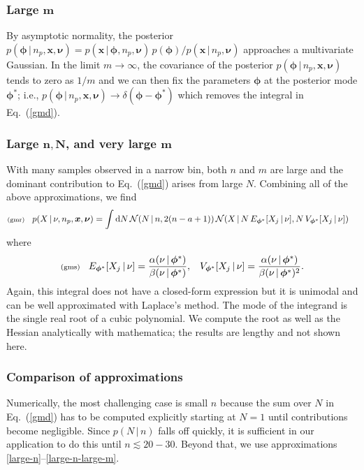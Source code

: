 \documentclass[11pt]{article}
\newcommand{\lleq}[1]{\label{#1} }
\renewcommand{\lleq}[1]{\label{#1} {\scriptstyle {\rm (#1)}} \hspace*{2ex} }
\newcommand{\cond}{\,|\,}
\newcommand{\bmm}{{\bm{m}}}
\newcommand{\bmn}{{\bm{n}}}
\newcommand{\bmx}{{{\bm{x}}}}
\newcommand{\bmN}{{\bm{N}}}
\newcommand{\bmphi}{{\bm{\phi}}}
\newcommand{\bmnu}{{\bm{\nu}}}
\newcommand{\refeq}[1]{Eq.~(\ref{#1})}
\newcommand{\npack}{n_p}
\newcommand{\rmdx}[1]{\mbox{d} #1 \,} %
\begin{document}
\subsubsection*{Large $\bmm$}\label{large-m}

By asymptotic normality, the posterior $p(\bmphi \cond \npack, \bmx,
\bmnu) = p(\bmx\cond \bmphi, \npack, \bmnu) \, p(\bmphi) / p(\bmx
\cond \npack, \bmnu)$ approaches a multivariate Gaussian. In the limit
$m \to \infty$, the covariance of the posterior $p(\bmphi \cond
\npack, \bmx, \bmnu)$ tends to zero as $1/m$ and we can then fix the
parameters $\bmphi$ at the posterior mode $\bmphi^*$; i.e., $p(\bmphi
\cond \npack, \bmx, \bmnu) \to \delta(\bmphi - \bmphi^*)$ which removes the integral in \refeq{gmd}.

\subsubsection*{Large $\bmn, \bmN$,  and very large $\bmm$} \label{large-n-large-m}

With many samples observed in a narrow bin, both $n$ and $m$ are large
and the dominant contribution to \refeq{gmd} arises from large
$N$. Combining all of the above approximations, we find
\begin{align}
  \lleq{gmr} %
  p(X\cond \nu, \npack,\bmx,\bmnu) &= %
  \int \rmdx{N} \mathcal{N}(N \cond n, 2 (n -a + 1)) \, \mathcal{N}(X \cond
  N \, E_{\bmphi^*}[X_j \cond \nu], N \, V_{\bmphi^*}[X_j \cond \nu])
\end{align}
where
\begin{align}
  \lleq{gms}%
  E_{\bmphi^*}[X_j \cond \nu] &= \frac{\alpha(\nu \cond
    \bmphi^*)}{\beta(\nu \cond \bmphi^*)}, & %
  V_{\bmphi^*}[X_j \cond \nu] = \frac{\alpha(\nu \cond
    \bmphi^*)}{\beta(\nu \cond \bmphi^*)^2}.
\end{align}
Again, this integral does not have a closed-form expression but it is
unimodal and can be well approximated with Laplace's method. The mode
of the integrand is the single real root of a cubic polynomial. We
compute the root as well as the Hessian analytically with mathematica; the results are lengthy and not shown here.

\subsubsection*{Comparison of approximations}

Numerically, the most challenging case is small $n$ because the sum
over $N$ in \refeq{gmd} has to be computed explicitly starting at
$N=1$ until contributions become negligible. Since $p(N \cond n)$
falls off quickly, it is sufficient in our application to do this
until $n \lesssim 20-30$. Beyond that, we use approximations
\ref{large-n}--\ref{large-n-large-m}.
\end{document}
